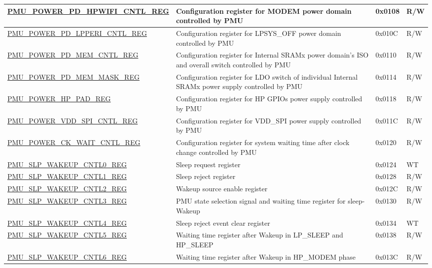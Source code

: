 \begin{longtable}{ | l | p{6cm} | p{1.3cm} | p{1.5cm} | }
\hyperref[regdesc:PMUPOWERPDHPWIFICNTLREG]{PMU\_POWER\_PD\_HPWIFI\_CNTL\_REG} & Configuration register for MODEM power domain controlled by PMU & 0x0108 & R/W \\ \hline
\hyperref[regdesc:PMUPOWERPDLPPERICNTLREG]{PMU\_POWER\_PD\_LPPERI\_CNTL\_REG} & Configuration register for LPSYS\_OFF power domain controlled by PMU & 0x010C & R/W \\ \hline
\hyperref[regdesc:PMUPOWERPDMEMCNTLREG]{PMU\_POWER\_PD\_MEM\_CNTL\_REG} & Configuration register for Internal SRAMx power domain's ISO and overall switch controlled by PMU & 0x0110 & R/W \\ \hline
\hyperref[regdesc:PMUPOWERPDMEMMASKREG]{PMU\_POWER\_PD\_MEM\_MASK\_REG} & Configuration register for LDO switch of individual Internal SRAMx power supply controlled by PMU & 0x0114 & R/W \\ \hline
\hyperref[regdesc:PMUPOWERHPPADREG]{PMU\_POWER\_HP\_PAD\_REG} & Configuration register for HP GPIOs power supply controlled by PMU & 0x0118 & R/W \\ \hline
\hyperref[regdesc:PMUPOWERVDDSPICNTLREG]{PMU\_POWER\_VDD\_SPI\_CNTL\_REG} & Configuration register for VDD\_SPI power supply controlled by PMU & 0x011C & R/W \\ \hline
\hyperref[regdesc:PMUPOWERCKWAITCNTLREG]{PMU\_POWER\_CK\_WAIT\_CNTL\_REG} & Configuration register for system waiting time after clock change controlled by PMU & 0x0120 & R/W \\ \hline
\hyperref[regdesc:PMUSLPWAKEUPCNTL0REG]{PMU\_SLP\_WAKEUP\_CNTL0\_REG} & Sleep request register & 0x0124 & WT \\ \hline
\hyperref[regdesc:PMUSLPWAKEUPCNTL1REG]{PMU\_SLP\_WAKEUP\_CNTL1\_REG} & Sleep reject register & 0x0128 & R/W \\ \hline
\hyperref[regdesc:PMUSLPWAKEUPCNTL2REG]{PMU\_SLP\_WAKEUP\_CNTL2\_REG} & Wakeup source enable register & 0x012C & R/W \\ \hline
\hyperref[regdesc:PMUSLPWAKEUPCNTL3REG]{PMU\_SLP\_WAKEUP\_CNTL3\_REG} & PMU state selection signal and waiting time register for sleep-Wakeup & 0x0130 & R/W \\ \hline
\hyperref[regdesc:PMUSLPWAKEUPCNTL4REG]{PMU\_SLP\_WAKEUP\_CNTL4\_REG} & Sleep reject event clear register & 0x0134 & WT \\ \hline
\hyperref[regdesc:PMUSLPWAKEUPCNTL5REG]{PMU\_SLP\_WAKEUP\_CNTL5\_REG} & Waiting time register after Wakeup in LP\_SLEEP and HP\_SLEEP & 0x0138 & R/W \\ \hline
\hyperref[regdesc:PMUSLPWAKEUPCNTL6REG]{PMU\_SLP\_WAKEUP\_CNTL6\_REG} & Waiting time register after Wakeup in HP\_MODEM phase & 0x013C & R/W \\ \hline

\end{longtable}
